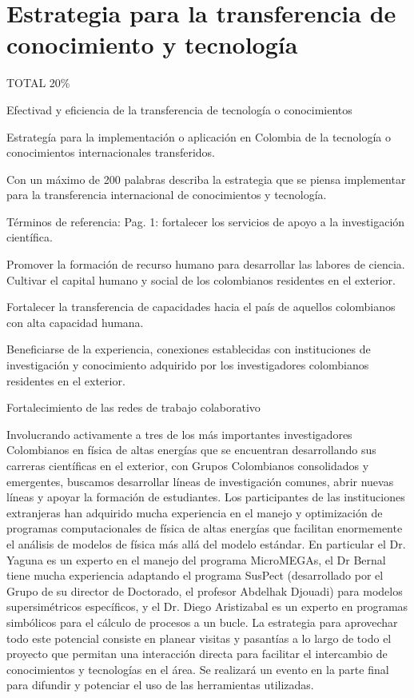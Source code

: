 \section{Estrategia para la transferencia de conocimiento y tecnología}
\begin{evaluacion}
  TOTAL 20\%

  Efectivad y eficiencia de la transferencia de tecnología o conocimientos 

  Estrategía para la implementación o aplicación en Colombia de la
  tecnología o conocimientos internacionales transferidos.
\end{evaluacion}

\begin{instrucciones}
Con un máximo de 200 palabras describa la estrategia que se piensa implementar para la transferencia internacional de conocimientos y tecnología.

  Términos de referencia:
  Pag. 1: fortalecer los servicios de apoyo a la investigación científica.

  Promover la formación de recurso humano para desarrollar las labores de ciencia. 
Cultivar el  capital humano y social de los colombianos residentes en el exterior.

Fortalecer la transferencia de capacidades hacia el país de aquellos colombianos con alta capacidad humana. 

Beneficiarse de la experiencia, conexiones establecidas con instituciones de investigación y conocimiento adquirido por los investigadores colombianos residentes en el exterior.

Fortalecimiento de las redes de trabajo colaborativo
\end{instrucciones}
Involucrando activamente a tres de los más importantes investigadores
Colombianos en física de altas energías que se encuentran
desarrollando sus carreras científicas en el exterior, con Grupos
Colombianos consolidados y emergentes, buscamos desarrollar líneas de
investigación comunes, abrir nuevas líneas y apoyar la formación de
estudiantes. Los participantes de las instituciones extranjeras han
adquirido mucha experiencia en el manejo y optimización de programas
computacionales de física de altas energías que facilitan enormemente
el análisis de modelos de física más allá del modelo estándar. En
particular el Dr. Yaguna es un experto en el manejo del programa
MicroMEGAs, el Dr Bernal tiene mucha experiencia adaptando el programa
SusPect (desarrollado por el Grupo de su director de Doctorado, el
profesor Abdelhak Djouadi) para modelos supersimétricos específicos, y
el Dr. Diego Aristizabal es un experto en programas simbólicos para el
cálculo de procesos a un bucle. La estrategia para aprovechar todo
este potencial consiste en planear visitas y pasantías a lo largo de
todo el proyecto que permitan una interacción directa para facilitar
el intercambio de conocimientos y tecnologías en el área. Se realizará
un evento en la parte final para difundir y potenciar el uso de las
herramientas utilizadas.


